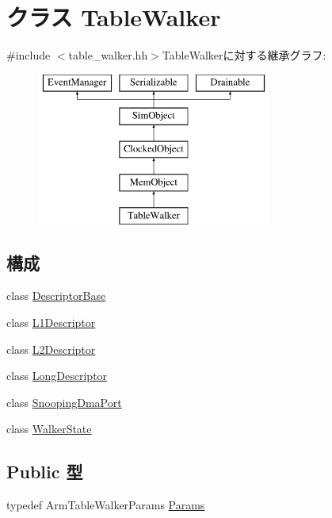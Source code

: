 \hypertarget{classArmISA_1_1TableWalker}{
\section{クラス TableWalker}
\label{classArmISA_1_1TableWalker}
}


{\ttfamily \#include $<$table\_\-walker.hh$>$}TableWalkerに対する継承グラフ:\begin{figure}[H]
\begin{center}
\leavevmode
\includegraphics[height=5cm]{classArmISA_1_1TableWalker}
\end{center}
\end{figure}
\subsection*{構成}
\begin{DoxyCompactItemize}
\item 
class \hyperlink{classArmISA_1_1TableWalker_1_1DescriptorBase}{DescriptorBase}
\item 
class \hyperlink{classArmISA_1_1TableWalker_1_1L1Descriptor}{L1Descriptor}
\item 
class \hyperlink{classArmISA_1_1TableWalker_1_1L2Descriptor}{L2Descriptor}
\item 
class \hyperlink{classArmISA_1_1TableWalker_1_1LongDescriptor}{LongDescriptor}
\item 
class \hyperlink{classArmISA_1_1TableWalker_1_1SnoopingDmaPort}{SnoopingDmaPort}
\item 
class \hyperlink{classArmISA_1_1TableWalker_1_1WalkerState}{WalkerState}
\end{DoxyCompactItemize}
\subsection*{Public 型}
\begin{DoxyCompactItemize}
\item 
typedef ArmTableWalkerParams \hyperlink{classArmISA_1_1TableWalker_a422d0236f689cd69d42b3163a521ea15}{Params}
\end{DoxyCompactItemize}
